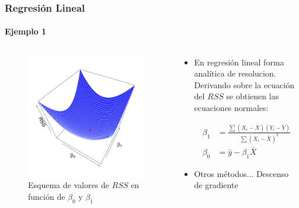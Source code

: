 \documentclass{beamer}
\begin{document}
\begin{frame}
\frametitle{Regresión Lineal}
\framesubtitle{Ejemplo 1}
\begin{columns}
	\begin{column}{0.5\textwidth}
		\centering
		\begin{figure}[h]
		\includegraphics[width=0.95\linewidth, height=0.6\textheight]{./img/pdf/3_2b}
		\caption{Esquema de valores de $RSS$ en función de $\beta_{0}$ y $\beta_{1}$ \cite{hastie02}}
		\end{figure}
	\end{column}
	\begin{column}{0.5\textwidth}
		\begin{itemize}
			\item En regresión lineal forma analítica de resolucion. Derivando sobre la ecuación del $RSS$ se obtienen las ecuaciones normales:
					
			\begin{equation}
				\begin{aligned}
					\beta_{1} & = \frac{\sum (X_{i} - \bar{X})(Y_{i} - \bar{Y})}{\sum(X_{i} - \bar{X})^2} \\
					\beta_{0} & = \bar{y} - \beta_{1}\bar{X} 
				\end{aligned}
			\end{equation}
			
			\item Otros métodos... Descenso de gradiente
		\end{itemize}
	\end{column}
	
\end{columns}
\end{frame}
\end{document}
